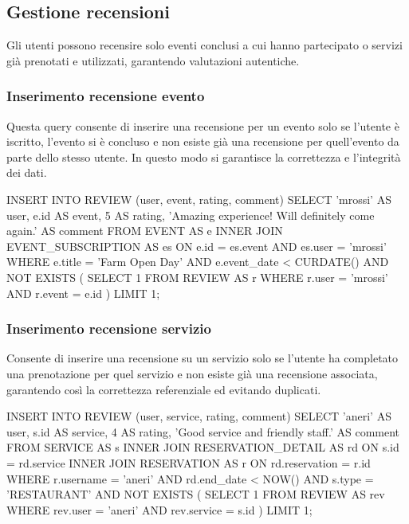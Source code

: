 \documentclass[a4paper,12pt]{report}
\begin{document}
\newpage
\subsection{Gestione recensioni}
Gli utenti possono recensire solo eventi conclusi a cui hanno
partecipato o servizi già prenotati e utilizzati, garantendo
valutazioni autentiche.

\subsubsection{Inserimento recensione evento}
Questa query consente di inserire una recensione per un evento solo
se l'utente è iscritto, l'evento si è concluso e non esiste già una
recensione per quell'evento da parte dello stesso utente. In questo
modo si garantisce la correttezza e l'integrità dei dati.

\begin{sqlcode}[caption={}]
INSERT INTO REVIEW (user, event, rating, comment)
SELECT
  'mrossi' AS user,
  e.id AS event,
  5 AS rating,
  'Amazing experience! Will definitely come again.' AS comment
FROM EVENT AS e
INNER JOIN EVENT_SUBSCRIPTION AS es ON e.id = es.event
  AND es.user = 'mrossi'
WHERE
  e.title = 'Farm Open Day'
  AND e.event_date < CURDATE()
    AND NOT EXISTS (
      SELECT 1
      FROM REVIEW AS r
      WHERE r.user = 'mrossi' AND r.event = e.id
  )
LIMIT 1;
\end{sqlcode}

\subsubsection{Inserimento recensione servizio}
Consente di inserire una recensione su un servizio solo se l'utente
ha completato una prenotazione per quel servizio e non esiste già una
recensione associata, garantendo così la correttezza referenziale ed
evitando duplicati.

\begin{sqlcode}[caption={}]
INSERT INTO REVIEW (user, service, rating, comment)
SELECT
  'aneri' AS user,
  s.id AS service,
  4 AS rating,
  'Good service and friendly staff.' AS comment
FROM SERVICE AS s
INNER JOIN RESERVATION_DETAIL AS rd ON s.id = rd.service
INNER JOIN RESERVATION AS r ON rd.reservation = r.id
WHERE
  r.username = 'aneri'
  AND rd.end_date < NOW()
  AND s.type = 'RESTAURANT'
  AND NOT EXISTS (
    SELECT 1
    FROM REVIEW AS rev
    WHERE rev.user = 'aneri' AND rev.service = s.id
  )
LIMIT 1;
\end{sqlcode}
\end{document}
